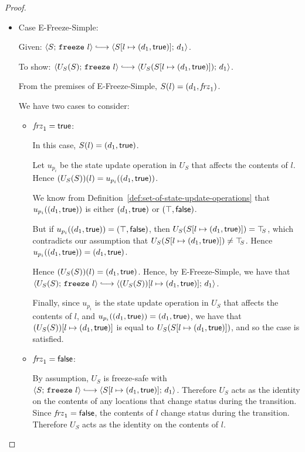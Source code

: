\begin{proof}
\begin{itemize}
    \item Case {\sc E-Freeze-Simple}:

      Given: $\config{S}{\freeze{l}} \parstepsto
      \config{\extS{S}{l}{d_1}{\frozentrue}}{d_1}$.

      To show: $\config{U_S(S)}{\freeze{l}} \parstepsto
      \config{U_S(\extS{S}{l}{d_1}{\frozentrue})}{d_1}$.

      From the premises of {\sc E-Freeze-Simple}, $S(l) =
      (d_1, \mathit{frz}_1)$.

      We have two cases to consider:
      \begin{itemize}
        \item $\mathit{frz}_1 = \textsf{true}$:

          In this case, $S(l) = (d_1, \textsf{true})$.

          Let $u_{p_i}$ be the state update operation in $U_S$ that
          affects the contents of $l$.  Hence $(U_S(S))(l) =
          u_{p_i}((d_1, \textsf{true}))$.

          We know from
          Definition~\ref{def:set-of-state-update-operations} that
          $u_{p_i}((d_1, \textsf{true}))$ is either
          $(d_1, \textsf{true})$ or $(\top, \textsf{false})$.

          But if $u_{p_i}((d_1, \textsf{true})) =
          (\top, \textsf{false})$, then
          $U_S(S[l \mapsto (d_1, \textsf{true})]) = \top\hspace{-0.85mm}_{S}$, which
          contradicts our assumption that
          $U_S(S[l \mapsto (d_1, \textsf{true})]) \neq \top\hspace{-0.85mm}_{S}$.  Hence
          $u_{p_i}((d_1, \textsf{true})) =
          (d_1, \textsf{true})$.

          Hence $(U_S(S))(l) = (d_1, \textsf{true})$.  Hence, by
          {\sc E-Freeze-Simple}, we have that
          $\config{U_S(S)}{\freeze{l}} \parstepsto
          \config{\extS{(U_S(S))}{l}{d_1}{\frozentrue}}{d_1}$.

          Finally, since $u_{p_i}$ is the state update operation in
          $U_S$ that affects the contents of $l$, and
          $u_{p_i}((d_1, \textsf{true})) =
          (d_1, \textsf{true})$, we have that
          $(U_S(S))[l \mapsto (d_1, \textsf{true})]$ is equal to
          $U_S(S[l \mapsto (d_1, \textsf{true})])$, and so the case is
          satisfied.

        \item $\mathit{frz}_1 = \textsf{false}$:

          By assumption, $U_S$ is freeze-safe with
          $\config{S}{\freeze{l}} \parstepsto
          \config{\extS{S}{l}{d_1}{\frozentrue}}{d_1}$.  Therefore
          $U_S$ acts as the identity on the contents of any locations
          that change status during the transition.  Since $\mathit{frz}_1
          = \textsf{false}$, the contents of $l$ change status during
          the transition.  Therefore $U_S$ acts as the identity on the
          contents of $l$.


\end{itemize}
\end{itemize}
\end{proof}
